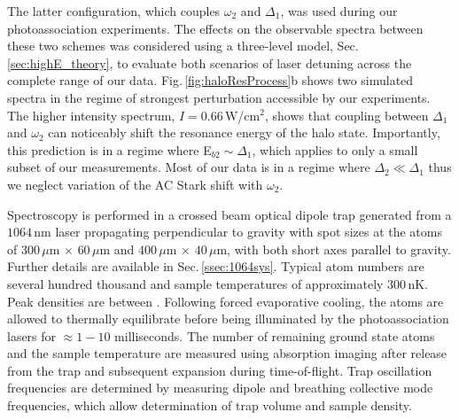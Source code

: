 The latter configuration, which couples $\omega_2$ and $\Delta_1$, was used during our photoassociation experiments.
The effects on the observable spectra between these two schemes was considered using a three-level model, Sec.\,\ref{sec:highE_theory}, to evaluate both scenarios of laser detuning across the complete range of our data.
Fig.\,\ref{fig:haloResProcess}b shows two simulated spectra in the regime of strongest perturbation accessible by our experiments.
The higher intensity spectrum, $I=0.66$\,W/cm$^2$, shows that coupling between $\Delta_1$ and $\omega_2$ can noticeably shift the resonance energy of the halo state. 
Importantly, this prediction is in a regime where E$_{b2} \sim \Delta_1$, which applies to only a small subset of our measurements.
Most of our data is in a regime where $\Delta_2 \ll \Delta_1$ thus we neglect variation of the AC Stark shift with $\omega_2$.


Spectroscopy is performed in a crossed beam optical dipole trap generated from a $1064$\,nm laser propagating perpendicular to gravity with spot sizes at the atoms of $300\,\mu\text{m}\,\times\,60\,\mu\text{m}$ and $400\,\mu\text{m}\,\times\,40\,\mu\text{m}$, with both short axes parallel to gravity.
Further details are available in Sec.\,\ref{ssec:1064sys}.
Typical atom numbers are several hundred thousand and sample temperatures of approximately $300\,\text{nK}$.
Peak densities are between .
Following forced evaporative cooling, the atoms are allowed to thermally equilibrate before being illuminated by the photoassociation lasers for $\approx\!1 - 10$ milliseconds.
The number of remaining ground state atoms and the sample temperature are measured using absorption imaging after release from the trap and subsequent expansion during time-of-flight.
Trap oscillation frequencies are determined by measuring dipole and breathing collective mode frequencies, which allow determination of trap volume and sample density.

